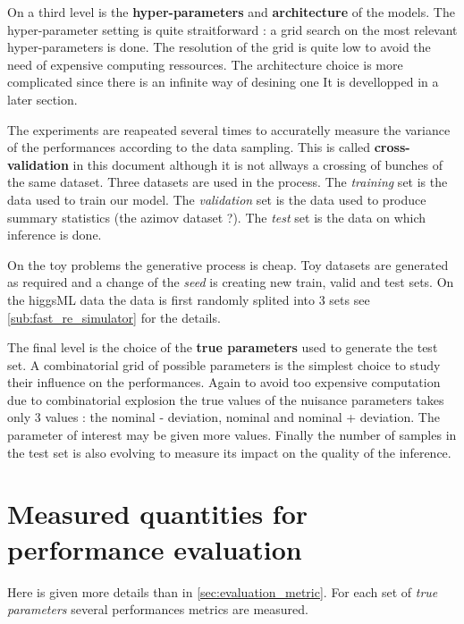 On a third level is the \textbf{hyper-parameters} and \textbf{architecture} of the models.
The hyper-parameter setting is quite straitforward : a grid search on the most relevant hyper-parameters is done.
The resolution of the grid is quite low to avoid the need of expensive computing ressources.
The architecture choice is more complicated since there is an infinite way of desining one
It is devellopped in a later section\needcite.

The experiments are reapeated several times to accuratelly measure the variance of the performances according to the data sampling.
This is called \textbf{cross-validation} in this document although it is not allways a crossing of bunches of the same dataset.
Three datasets are used in the process.
The \emph{training} set is the data used to train our model.
The \emph{validation} set is the data used to produce summary statistics (the azimov dataset ?).
The \emph{test} set is the data on which inference is done.

On the toy problems the generative process is cheap.
Toy datasets are generated as required and a change of the \emph{seed} is creating new train, valid and test sets.
On the higgsML data the data is first randomly splited into 3 sets see \autoref{sub:fast_re_simulator} for the details.

The final level is the choice of the \textbf{true parameters} used to generate the test set.
A combinatorial grid of possible parameters is the simplest choice to study their influence on the performances.
Again to avoid too expensive computation due to combinatorial explosion the true values of the nuisance parameters takes only 3 values :
the nominal - deviation, nominal and nominal + deviation.
The parameter of interest may be given more values.
Finally the number of samples in the test set is also evolving to measure its impact on the quality of the inference.



\section{Measured quantities for performance evaluation} %
\label{sec:measured_quantities_for_performance_evaluation}


Here is given more details than in \autoref{sec:evaluation_metric}.
For each set of \emph{true parameters} several performances metrics are measured.

